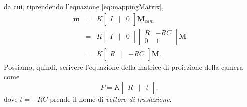 da cui, riprendendo l'equazione \ref{eq:mappingMatrix},
\begin{eqnarray}
\textbf{m} & = & K \left[\begin{array}{rcl}
I & | & 0
\end{array}\right]\textbf{M}_{cam} \nonumber \\
 & = & K \left[\begin{array}{rcl}
I & | & 0
\end{array}\right] 
\left[\begin{array}{cc}
R & -RC\\
0 & 1 
\end{array}\right] \textbf{M} \nonumber \\
 & = &
K \left[\begin{array}{rcl}
R & | & -RC
\end{array}\right]\textbf{M}. \nonumber
\end{eqnarray}
Possiamo, quindi, scrivere l'equazione della matrice di proiezione della camera come
\[P=K \left[\begin{array}{rcl}
R & | & t
\end{array}\right],\]
dove $t = -RC$ prende il nome di \textit{vettore di traslazione}.
